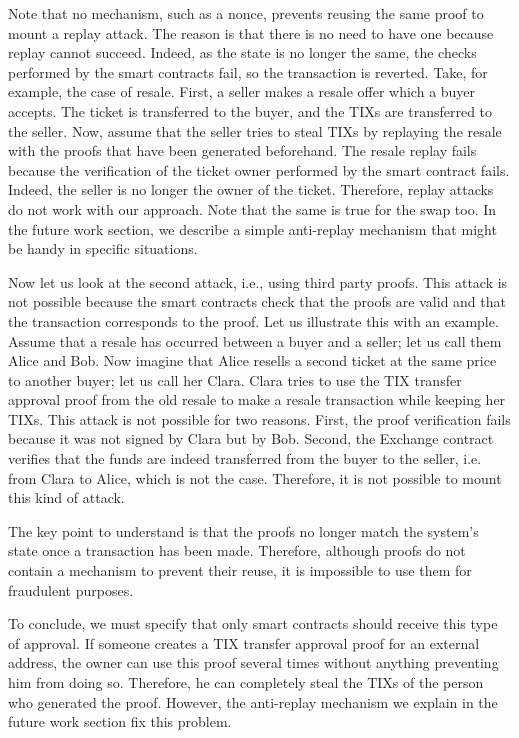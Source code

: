 \documentclass[a4paper,11pt,oneside]{report}
\begin{document}
Note that no mechanism, such as a nonce, prevents reusing the same proof to mount a replay attack. The reason is that there is no need to have one because replay cannot succeed. Indeed, as the state is no longer the same, the checks performed by the smart contracts fail, so the transaction is reverted. Take, for example, the case of resale. First, a seller makes a resale offer which a buyer accepts. The ticket is transferred to the buyer, and the TIXs are transferred to the seller. Now, assume that the seller tries to steal TIXs by replaying the resale with the proofs that have been generated beforehand. The resale replay fails because the verification of the ticket owner performed by the smart contract fails. Indeed, the seller is no longer the owner of the ticket. Therefore, replay attacks do not work with our approach. Note that the same is true for the swap too. In the future work section, we describe a simple anti-replay mechanism that might be handy in specific situations.

Now let us look at the second attack, i.e., using third party proofs. This attack is not possible because the smart contracts check that the proofs are valid and that the transaction corresponds to the proof. Let us illustrate this with an example. Assume that a resale has occurred between a buyer and a seller; let us call them Alice and Bob. Now imagine that Alice resells a second ticket at the same price to another buyer; let us call her Clara. Clara tries to use the TIX transfer approval proof from the old resale to make a resale transaction while keeping her TIXs. This attack is not possible for two reasons. First, the proof verification fails because it was not signed by Clara but by Bob. Second, the Exchange contract verifies that the funds are indeed transferred from the buyer to the seller, i.e. from Clara to Alice, which is not the case. Therefore, it is not possible to mount this kind of attack.

The key point to understand is that the proofs no longer match the system's state once a transaction has been made. Therefore, although proofs do not contain a mechanism to prevent their reuse, it is impossible to use them for fraudulent purposes.

To conclude, we must specify that only smart contracts should receive this type of approval. If someone creates a TIX transfer approval proof for an external address, the owner can use this proof several times without anything preventing him from doing so. Therefore, he can completely steal the TIXs of the person who generated the proof. However, the anti-replay mechanism we explain in the future work section fix this problem.
\end{document}
